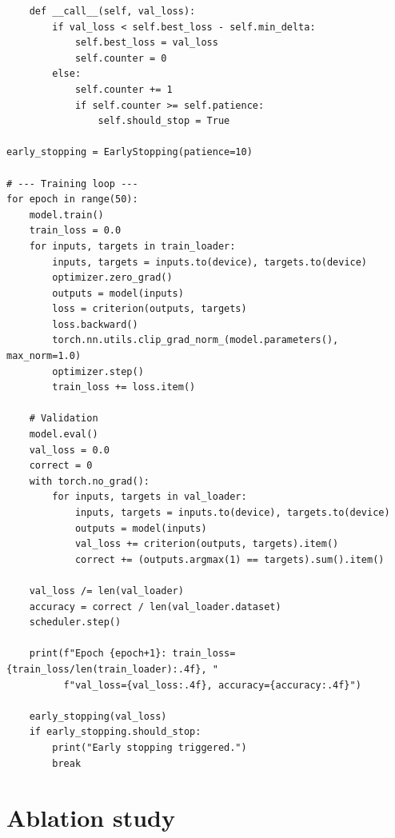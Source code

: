 \begin{codeblock}[title=\textbf{Complete regularized training loop}]
\begin{verbatim}
    def __call__(self, val_loss):
        if val_loss < self.best_loss - self.min_delta:
            self.best_loss = val_loss
            self.counter = 0
        else:
            self.counter += 1
            if self.counter >= self.patience:
                self.should_stop = True

early_stopping = EarlyStopping(patience=10)

# --- Training loop ---
for epoch in range(50):
    model.train()
    train_loss = 0.0
    for inputs, targets in train_loader:
        inputs, targets = inputs.to(device), targets.to(device)
        optimizer.zero_grad()
        outputs = model(inputs)
        loss = criterion(outputs, targets)
        loss.backward()
        torch.nn.utils.clip_grad_norm_(model.parameters(), max_norm=1.0)
        optimizer.step()
        train_loss += loss.item()

    # Validation
    model.eval()
    val_loss = 0.0
    correct = 0
    with torch.no_grad():
        for inputs, targets in val_loader:
            inputs, targets = inputs.to(device), targets.to(device)
            outputs = model(inputs)
            val_loss += criterion(outputs, targets).item()
            correct += (outputs.argmax(1) == targets).sum().item()

    val_loss /= len(val_loader)
    accuracy = correct / len(val_loader.dataset)
    scheduler.step()

    print(f"Epoch {epoch+1}: train_loss={train_loss/len(train_loader):.4f}, "
          f"val_loss={val_loss:.4f}, accuracy={accuracy:.4f}")

    early_stopping(val_loss)
    if early_stopping.should_stop:
        print("Early stopping triggered.")
        break
\end{verbatim}
\end{codeblock}

\section{Ablation study}
\label{sec:reg-ablation}

